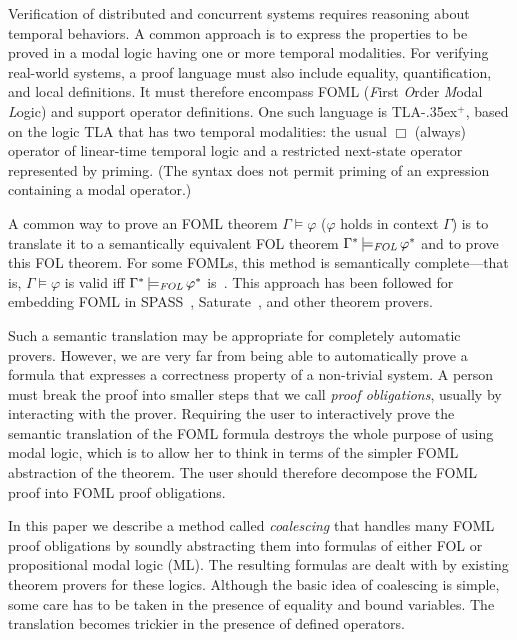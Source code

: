 \documentclass[a4paper,fleqn,envcountsame,orivec]{llncs}
\newcommand{\tlaplus}{\mbox{TLA\kern -.35ex$^+$}\xspace}
\newcommand{\FOL}[1]{\ensuremath{#1_{\textit{\scriptsize FOL}}}}
\newcommand{\folmodels}{\mathop{\models_{\textit{\scriptsize FOL}}}}
\newcommand{\edmargin}[2]{\marginpar{\raggedright\footnotesize\color{red}#1: #2}}
\newcommand{\edmargin}[2]{}
\def\llmargin{\edmargin{LL}}
\def\smmargin{\edmargin{SM}}
\begin{document}
Verification of distributed and concurrent systems requires reasoning
about temporal behaviors.  A common approach is to express the
properties to be proved in a modal logic having one or more temporal
modalities.  For verifying real-world systems, a proof language must
also include equality, quantification, and local definitions.  It must
therefore encompass FOML (\emph{F}irst \emph{O}rder \emph{M}odal
\emph{L}ogic) and support operator definitions.  One such language is
\tlaplus \cite{lamport:tla+}, based on the logic TLA
that has two temporal modalities: the
usual $\Box$ (always) operator of linear-time temporal logic and a
restricted next-state operator represented by priming.  (The syntax
does not permit priming of an expression containing a modal operator.)

A common way to prove an FOML theorem
%
%
$\Gamma\models\varphi$ ($\varphi$ holds in context $\Gamma$)
is to translate it to a semantically equivalent FOL theorem
$\Gamma^* \folmodels \varphi^*$
%
%
and to prove this FOL theorem.  For some FOMLs, this method is
semantically complete---that is, $\Gamma\models\varphi$ is valid iff
$\Gamma^* \folmodels \varphi^*$ is~\cite{ohlbach:translation}.
%
This approach has been followed for embedding FOML in
SPASS~\cite{hustadt:mspass}, Saturate~\cite{ganzinger:saturate}, and other theorem
provers.

Such a semantic translation may be appropriate for completely
automatic provers.  However, we are very far from being able to
automatically prove a formula that expresses a correctness property of
a non-trivial system.  A person must break the proof into smaller
steps that we call \emph{proof obligations}, usually by interacting
with the prover.  Requiring the user to interactively prove the
semantic translation of the FOML formula destroys the whole purpose of
using modal logic, which is to allow her to think in terms of the
simpler FOML abstraction of the theorem.  The user should therefore
decompose the FOML proof into FOML proof obligations.

In this paper we describe a method called \emph{coalescing} that handles many
FOML proof obligations by soundly abstracting them into formulas of either FOL
or propositional modal logic (ML). The resulting formulas are dealt with by
existing theorem provers for these logics. Although the basic idea of coalescing
is simple, some care has to be taken in the presence of equality and bound
variables. The translation becomes trickier in the presence of defined
operators.
\end{document}
